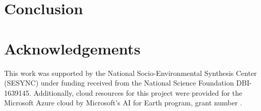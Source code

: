 \documentclass{article}
\begin{document}





\section{Conclusion}

\section{Acknowledgements}
This work was supported by the National Socio-Environmental Synthesis Center (SESYNC) under funding received from the National Science Foundation DBI-1639145.  Additionally, cloud resources for this project were provided for the Microsoft Azure cloud by Microsoft's AI for Earth program, grant number .

\printbibliography
\end{document}

